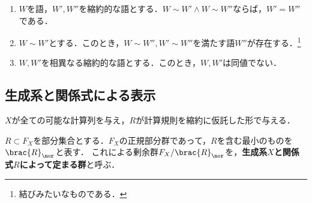 \documentclass[uplatex,dvipdfmx]{jsreport}
\begin{document}
\begin{proposition}[自由群の完全代表系]\mbox{}
    \begin{enumerate}
        \item $W$を語，$W',W''$を縮約的な語とする．$W\sim W'\land W\sim W''$ならば，$W'=W''$である．
        \item $W\sim W'$とする．このとき，$W\sim W'',W'\sim W''$を満たす語$W''$が存在する．\footnote{結びみたいなものである．}
        \item $W,W'$を相異なる縮約的な語とする．このとき，$W,W'$は同値でない．
    \end{enumerate}
\end{proposition}

\subsection{生成系と関係式による表示}

\begin{tcolorbox}[colframe=ForestGreen, colback=ForestGreen!10!white,breakable,colbacktitle=ForestGreen!40!white,coltitle=black,fonttitle=\bfseries\sffamily,
title=]
    $X$が全ての可能な計算列を与え，$R$が計算規則を縮約に仮託した形で与える．
\end{tcolorbox}

\begin{definition}
    $R\subset F_X$を部分集合とする．$F_X$の正規部分群であって，$R$を含む最小のものを$\brac{R}_\nor$と表す．
    これによる剰余群$F_X/\brac{R}_\nor$を，\textbf{生成系$X$と関係式$R$によって定まる群}と呼ぶ．
\end{definition}
\end{document}
